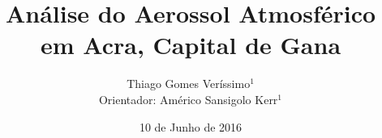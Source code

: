 \documentclass{beamer}
\begin{document}
  \title{Análise do Aerossol Atmosférico em Acra, Capital de Gana}
  \author{Thiago Gomes Veríssimo$^1$ \\
          Orientador: Américo Sansigolo Kerr$^1$}
  \date{10 de Junho de 2016}

\begin{frame}
  \titlepage
\end{frame}

\begin{frame}
  \tableofcontents
\end{frame}





\end{document}
